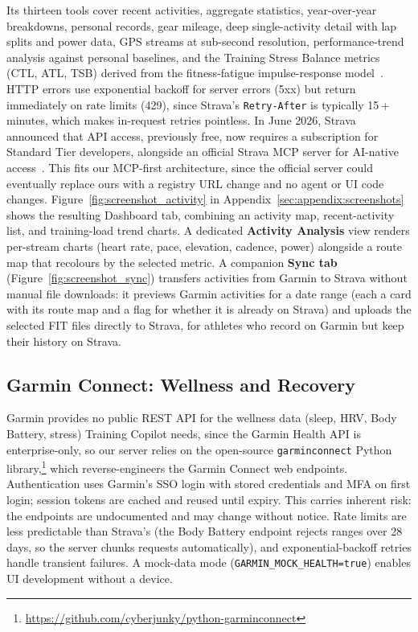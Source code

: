 Its thirteen tools cover recent activities, aggregate statistics, year-over-year breakdowns, personal records, gear mileage, deep single-activity detail with lap splits and power data, GPS streams at sub-second resolution, performance-trend analysis against personal baselines, and the Training Stress Balance metrics (CTL, ATL, TSB) derived from the fitness-fatigue impulse-response model~\citep{morton_modeling_1990}. HTTP errors use exponential backoff for server errors (5xx) but return immediately on rate limits (429), since Strava's \texttt{Retry-After} is typically 15\,+ minutes, which makes in-request retries pointless. In June 2026, Strava announced that API access, previously free, now requires a subscription for Standard Tier developers, alongside an official Strava MCP server for AI-native access~\citep{strava_api_update_2026}. This fits our MCP-first architecture, since the official server could eventually replace ours with a registry URL change and no agent or UI code changes. Figure~\ref{fig:screenshot_activity} in Appendix~\ref{sec:appendix:screenshots} shows the resulting Dashboard tab, combining an activity map, recent-activity list, and training-load trend charts. A dedicated \textbf{Activity Analysis} view renders per-stream charts (heart rate, pace, elevation, cadence, power) alongside a route map that recolours by the selected metric. A companion \textbf{Sync tab} (Figure~\ref{fig:screenshot_sync}) transfers activities from Garmin to Strava without manual file downloads: it previews Garmin activities for a date range (each a card with its route map and a flag for whether it is already on Strava) and uploads the selected FIT files directly to Strava, for athletes who record on Garmin but keep their history on Strava.

\subsection{Garmin Connect: Wellness and Recovery}\label{sec:data:garmin}

Garmin provides no public REST API for the wellness data (sleep, HRV, Body Battery, stress) Training Copilot needs, since the Garmin Health API is enterprise-only, so our server relies on the open-source \texttt{garminconnect} Python library,\footnote{\url{https://github.com/cyberjunky/python-garminconnect}} which reverse-engineers the Garmin Connect web endpoints. Authentication uses Garmin's SSO login with stored credentials and MFA on first login; session tokens are cached and reused until expiry. This carries inherent risk: the endpoints are undocumented and may change without notice. Rate limits are less predictable than Strava's (the Body Battery endpoint rejects ranges over 28 days, so the server chunks requests automatically), and exponential-backoff retries handle transient failures. A mock-data mode (\texttt{GARMIN\_MOCK\_HEALTH=true}) enables UI development without a device.

